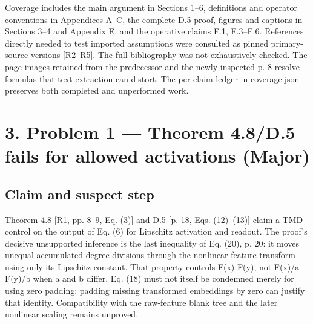 \documentclass[10pt]{article}
\begin{document}
Coverage includes the main argument in Sections 1–6, definitions and operator conventions in Appendices A–C, the complete D.5 proof, figures and captions in Sections 3–4 and Appendix E, and the operative claims F.1, F.3–F.6. References directly needed to test imported assumptions were consulted as pinned primary-source versions [R2–R5]. The full bibliography was not exhaustively checked. The page images retained from the predecessor and the newly inspected p. 8 resolve formulas that text extraction can distort. The per-claim ledger in coverage.json preserves both completed and unperformed work.\par
\section*{3. Problem 1 — Theorem 4.8/D.5 fails for allowed activations (Major)}
\subsection*{Claim and suspect step}
Theorem 4.8 [R1, pp. 8–9, Eq. (3)] and D.5 [p. 18, Eqs. (12)–(13)] claim a TMD control on the output of Eq. (6) for Lipschitz activation and readout. The proof’s decisive unsupported inference is the last inequality of Eq. (20), p. 20: it moves unequal accumulated degree divisions through the nonlinear feature transform using only its Lipschitz constant. That property controls F(x)-F(y), not F(x)/a-F(y)/b when a and b differ. Eq. (18) must not itself be condemned merely for using zero padding: padding missing transformed embeddings by zero can justify that identity. Compatibility with the raw-feature blank tree and the later nonlinear scaling remains unproved.\par
\end{document}
